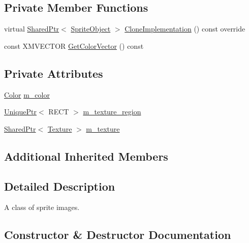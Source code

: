 \subsection*{Private Member Functions}
\begin{DoxyCompactItemize}
\item 
virtual \hyperlink{namespacemage_a1e01ae66713838a7a67d30e44c67703e}{Shared\+Ptr}$<$ \hyperlink{classmage_1_1_sprite_object}{Sprite\+Object} $>$ \hyperlink{classmage_1_1_sprite_image_ab1261e3d33ef4de77523bd9c0920dd54}{Clone\+Implementation} () const override
\item 
const X\+M\+V\+E\+C\+T\+OR \hyperlink{classmage_1_1_sprite_image_a08c7f8a40dd8097f849cb0469a12703c}{Get\+Color\+Vector} () const
\end{DoxyCompactItemize}
\subsection*{Private Attributes}
\begin{DoxyCompactItemize}
\item 
\hyperlink{structmage_1_1_color}{Color} \hyperlink{classmage_1_1_sprite_image_a63331a3170f5af1a14b15913afc59ce2}{m\+\_\+color}
\item 
\hyperlink{namespacemage_a8c307fbcc33bce9b7f2aa4c26c3b95cf}{Unique\+Ptr}$<$ R\+E\+CT $>$ \hyperlink{classmage_1_1_sprite_image_a8d20ef6d6470dc01f73a599060953b65}{m\+\_\+texture\+\_\+region}
\item 
\hyperlink{namespacemage_a1e01ae66713838a7a67d30e44c67703e}{Shared\+Ptr}$<$ \hyperlink{classmage_1_1_texture}{Texture} $>$ \hyperlink{classmage_1_1_sprite_image_a8416fc862782dc019e15275261e7ca15}{m\+\_\+texture}
\end{DoxyCompactItemize}
\subsection*{Additional Inherited Members}


\subsection{Detailed Description}
A class of sprite images. 

\subsection{Constructor \& Destructor Documentation}
\hypertarget{classmage_1_1_sprite_image_a11448d089eb7a52002faa59fe6600182}{}\label{classmage_1_1_sprite_image_a11448d089eb7a52002faa59fe6600182} 
